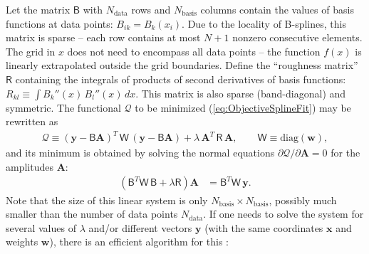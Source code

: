 \documentclass[12pt]{article}
\renewcommand{\d}{\partial}
\newcommand{\bA}{\boldsymbol{A}}
\newcommand{\bx}{\boldsymbol{x}}
\newcommand{\by}{\boldsymbol{y}}
\begin{document}
Let the matrix $\mathsf{B}$ with $N_\mathrm{data}$ rows and $N_\mathrm{basis}$ columns contain the values of basis functions at data points: $B_{ik} = B_k(x_i)$. Due to the locality of B-splines, this matrix is sparse -- each row contains at most $N+1$ nonzero consecutive elements. The grid in $x$ does not need to encompass all data points -- the function $f(x)$ is linearly extrapolated outside the grid boundaries.
Define the ``roughness matrix'' $\mathsf{R}$ containing the integrals of products of second derivatives of basis functions: $R_{kl} \equiv \int B_k''(x) \, B_l''(x)\, dx$. This matrix is also sparse (band-diagonal) and symmetric.
The functional $\mathcal{Q}$ to be minimized (\ref{eq:ObjectiveSplineFit}) may be rewritten as
\begin{align}  \label{eq:ObjectiveSplineFit2}
\mathcal{Q}\equiv (\by - \mathsf{B} \bA)^{T}\, \mathsf{W}\, (\by - \mathsf{B} \bA) +
\lambda\, \bA^T\,\mathsf{R}\, \bA, \qquad \mathsf{W}\equiv \mathrm{diag}(\boldsymbol{w}),
\end{align}
and its minimum is obtained by solving the normal equations $\d\mathcal{Q}/\d\bA=0$ for the amplitudes $\bA$:
\begin{align}  \label{eq:SplineFitSol}
\left(\mathsf{B}^T\mathsf{W\,B} + \lambda \mathsf{R} \right) \bA &= \mathsf{B}^T\mathsf{W}\,\by .
\end{align}
Note that the size of this linear system is only $N_\mathrm{basis}\times N_\mathrm{basis}$, possibly much smaller than the number of data points $N_\mathrm{data}$. If one needs to solve the system for several values of $\lambda$ and/or different vectors $\by$ (with the same coordinates $\bx$ and weights $\boldsymbol{w}$), there is an efficient algorithm for this \cite{RuppertWandCarroll}:
\end{document}
